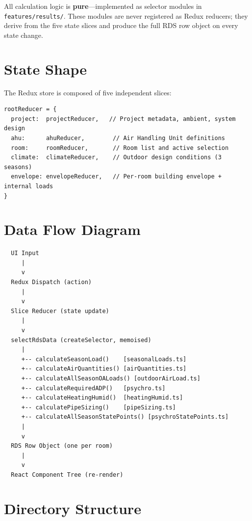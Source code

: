 \documentclass[12pt, a4paper, oneside]{report}
\newcommand{\file}[1]{\texttt{\textcolor{codeblue}{#1}}}
\begin{document}
All calculation logic is \textbf{pure}---implemented as selector modules in \file{features/results/}. These modules are never registered as Redux reducers; they derive from the five state slices and produce the full RDS row object on every state change.

\section{State Shape}

The Redux store is composed of five independent slices:

\begin{lstlisting}[language={}, caption={Root Reducer Composition}]
rootReducer = {
  project:  projectReducer,   // Project metadata, ambient, system design
  ahu:      ahuReducer,        // Air Handling Unit definitions
  room:     roomReducer,       // Room list and active selection
  climate:  climateReducer,    // Outdoor design conditions (3 seasons)
  envelope: envelopeReducer,   // Per-room building envelope + internal loads
}
\end{lstlisting}

\section{Data Flow Diagram}

\begin{verbatim}
  UI Input
     |
     v
  Redux Dispatch (action)
     |
     v
  Slice Reducer (state update)
     |
     v
  selectRdsData (createSelector, memoised)
     |
     +-- calculateSeasonLoad()    [seasonalLoads.ts]
     +-- calculateAirQuantities() [airQuantities.ts]
     +-- calculateAllSeasonOALoads() [outdoorAirLoad.ts]
     +-- calculateRequiredADP()   [psychro.ts]
     +-- calculateHeatingHumid()  [heatingHumid.ts]
     +-- calculatePipeSizing()    [pipeSizing.ts]
     +-- calculateAllSeasonStatePoints() [psychroStatePoints.ts]
     |
     v
  RDS Row Object (one per room)
     |
     v
  React Component Tree (re-render)
\end{verbatim}

\section{Directory Structure}
\end{document}
